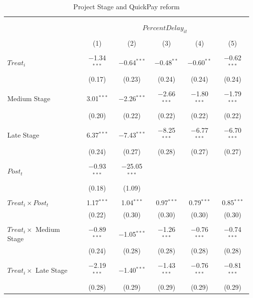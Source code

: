 \documentclass[
]{article}
\begin{document}
\begin{table}[H] \centering 
  \caption{Project Stage and QuickPay reform} 
  \label{} 
\small 
\begin{tabular}{@{\extracolsep{-2pt}}lccccc} 
\\[-1.8ex]\hline 
\hline \\[-1.8ex] 
\\[-1.8ex] & \multicolumn{5}{c}{$PercentDelay_{it}$  } \\ 
\\[-1.8ex] & (1) & (2) & (3) & (4) & (5)\\ 
\hline \\[-1.8ex] 
 $Treat_i$ & $-$1.34$^{***}$ & $-$0.64$^{***}$ & $-$0.48$^{**}$ & $-$0.60$^{**}$ & $-$0.62$^{***}$ \\ 
  & (0.17) & (0.23) & (0.24) & (0.24) & (0.24) \\ 
  & & & & & \\ 
 Medium Stage & 3.01$^{***}$ & $-$2.26$^{***}$ & $-$2.66$^{***}$ & $-$1.80$^{***}$ & $-$1.79$^{***}$ \\ 
  & (0.20) & (0.22) & (0.22) & (0.22) & (0.22) \\ 
  & & & & & \\ 
 Late Stage & 6.37$^{***}$ & $-$7.43$^{***}$ & $-$8.25$^{***}$ & $-$6.77$^{***}$ & $-$6.70$^{***}$ \\ 
  & (0.24) & (0.27) & (0.28) & (0.27) & (0.27) \\ 
  & & & & & \\ 
 $Post_t$ & $-$0.93$^{***}$ & $-$25.05$^{***}$ &  &  &  \\ 
  & (0.18) & (1.09) &  &  &  \\ 
  & & & & & \\ 
 $Treat_i \times Post_t$ & 1.17$^{***}$ & 1.04$^{***}$ & 0.97$^{***}$ & 0.79$^{***}$ & 0.85$^{***}$ \\ 
  & (0.22) & (0.30) & (0.30) & (0.30) & (0.30) \\ 
  & & & & & \\ 
 $Treat_i \times$ Medium Stage & $-$0.89$^{***}$ & $-$1.05$^{***}$ & $-$1.26$^{***}$ & $-$0.76$^{***}$ & $-$0.74$^{***}$ \\ 
  & (0.24) & (0.28) & (0.28) & (0.28) & (0.28) \\ 
  & & & & & \\ 
 $Treat_i \times$ Late Stage & $-$2.19$^{***}$ & $-$1.40$^{***}$ & $-$1.43$^{***}$ & $-$0.76$^{***}$ & $-$0.81$^{***}$ \\ 
  & (0.28) & (0.29) & (0.29) & (0.29) & (0.29) \\ 

\end{tabular}
\end{table}
\end{document}
